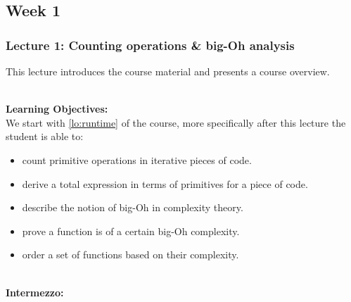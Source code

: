 \subsection{Week 1}
\label{sub:week_1}

\subsubsection{Lecture 1: Counting operations \& big-Oh analysis}
\label{sub:lecture_1}

This lecture introduces the course material and presents a course overview. 

\hfill\\
\textbf{Learning Objectives:}\\
We start with \cref{lo:runtime}
of the course, more specifically after this lecture the student is able to:
\begin{itemize}
	\item count primitive operations in iterative pieces of code.
	\item derive a total expression in terms of primitives for a piece of code.
	\item describe the notion of big-Oh in complexity theory.
	\item prove a function is of a certain big-Oh complexity.
	\item order a set of functions based on their complexity.
\end{itemize}

\hfill\\
\textbf{Intermezzo:}\\

